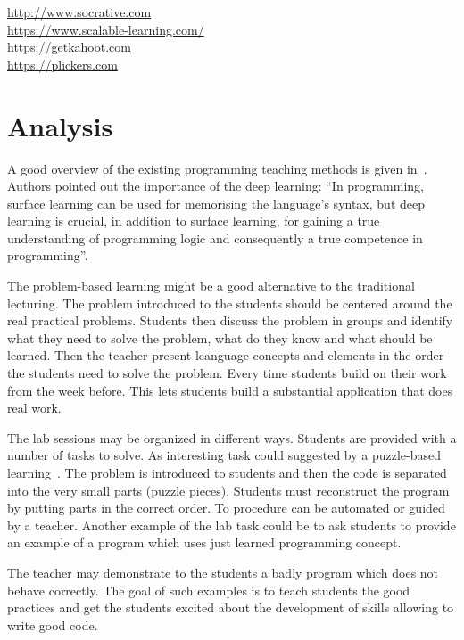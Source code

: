\documentclass{article}
\begin{document}
\url{http://www.socrative.com}\\
\url{https://www.scalable-learning.com/}\\ %
\url{https://getkahoot.com}\\
\url{https://plickers.com}

\section{Analysis} %
\label{sec:analysis}




A good overview of the existing programming teaching methods is given
in~\cite{mohorovivcic2011overview}. Authors pointed out the importance
of the deep learning: ``In programming, surface learning can be used
for memorising the language’s syntax, but deep learning is crucial, in
addition to surface learning, for gaining a true understanding of
programming logic and consequently a true competence in
programming''.

The problem-based learning might be a good alternative to the
traditional lecturing.  The problem introduced to the students should
be centered around the real practical problems. Students then discuss
the problem in groups and identify what they need to solve the
problem, what do they know and what should be learned. Then the
teacher present leanguage concepts and elements in the order the
students need to solve the problem. Every time students build
on their work from the week before. This lets students build a
substantial application that does real work.


The lab sessions may be organized in different ways. Students are
provided with a number of tasks to solve. As interesting task could
suggested by a puzzle-based
learning~\cite{mohorovivcic2011overview}. The problem is introduced to
students and then the code is separated into the very small parts
(puzzle pieces). Students must reconstruct the program by putting
parts in the correct order. To procedure can be automated or guided by
a teacher. Another example of the lab task could be to ask students to
provide an example of a program which uses just learned programming
concept.


The teacher may demonstrate to the students a badly program which does
not behave correctly. The goal of such examples is to teach students
the good practices and get the students excited about the development
of skills allowing to write good code.
\end{document}
